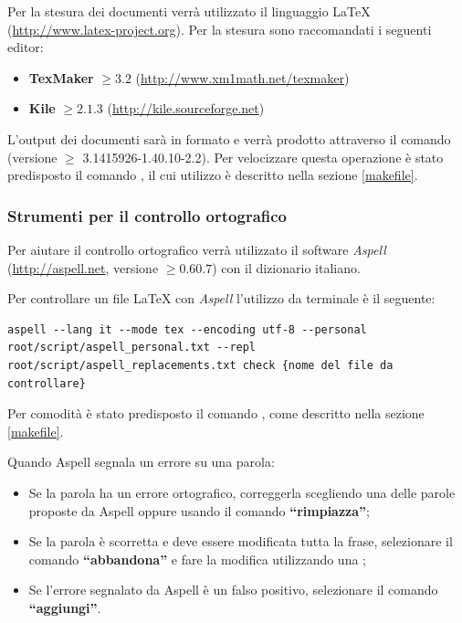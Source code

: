 		Per la stesura dei documenti verrà utilizzato il linguaggio \LaTeX{} (\url{http://www.latex-project.org}).
		Per la stesura sono raccomandati i seguenti editor:
		\begin{itemize}
		 \item \textbf{TexMaker} $\geq 3.2$ (\url{http://www.xm1math.net/texmaker})
		 \item \textbf{Kile} $\geq 2.1.3$ (\url{http://kile.sourceforge.net})
		\end{itemize}
		
		L'output dei documenti sarà in formato  e verrà prodotto attraverso il comando  (versione $\geq$ 3.1415926-1.40.10-2.2). Per velocizzare questa operazione è stato predisposto il comando , il cui utilizzo è descritto nella sezione \ref{makefile}.
		
		\subsubsection{Strumenti per il controllo ortografico}
		
		Per aiutare il controllo ortografico verrà utilizzato il software \emph{Aspell} (\url{http://aspell.net}, versione $\geq 0.60.7$) con il dizionario italiano.
		
		Per controllare un file \LaTeX{} con \emph{Aspell} l'utilizzo da terminale è il seguente:
\begin{lstlisting}
aspell --lang it --mode tex --encoding utf-8 --personal root/script/aspell_personal.txt --repl root/script/aspell_replacements.txt check {nome del file da controllare}
\end{lstlisting}
		
		Per comodità è stato predisposto il comando , come descritto nella sezione \ref{makefile}.
		
		Quando Aspell segnala un errore su una parola:
		\begin{itemize}
		 \item Se la parola ha un errore ortografico, correggerla scegliendo una delle parole proposte da Aspell oppure usando il comando \textbf{``rimpiazza''};
		 \item Se la parola è scorretta e deve essere modificata tutta la frase, selezionare il comando \textbf{``abbandona''} e fare la modifica utilizzando una ;
		 \item Se l'errore segnalato da Aspell è un falso positivo, selezionare il comando \textbf{``aggiungi''}.
		\end{itemize}


